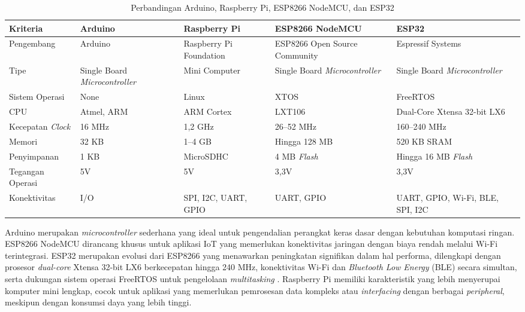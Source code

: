 \begin{enumerate}
  \begin{table}[H]
    \caption{Perbandingan Arduino, Raspberry Pi, ESP8266 NodeMCU, dan ESP32 \autocite{ooko2019, espressif2021}}
    \label{tab:perbandingan-mcu}
    \begin{tabularx}{\textwidth}{| l | X | X | X | X |}
      \hline
      \textbf{Kriteria} & \textbf{Arduino} & \textbf{Raspberry Pi} & \textbf{ESP8266 NodeMCU} & \textbf{ESP32} \\
      \hline
      Pengembang & Arduino & Raspberry Pi Foundation & ESP8266 Open Source Community & Espressif Systems \\
      \hline
      Tipe & Single Board \textit{Microcontroller} & Mini Computer & Single Board \textit{Microcontroller} & Single Board \textit{Microcontroller} \\
      \hline
      Sistem Operasi & None & Linux & XTOS & FreeRTOS \\
      \hline
      CPU & Atmel, ARM & ARM Cortex & LXT106 & Dual-Core Xtensa 32-bit LX6 \\
      \hline
      Kecepatan \textit{Clock} & 16 MHz & 1,2 GHz & 26--52 MHz & 160--240 MHz \\
      \hline
      Memori & 32 KB & 1--4 GB & Hingga 128 MB & 520 KB SRAM \\
      \hline
      Penyimpanan & 1 KB & MicroSDHC & 4 MB \textit{Flash} & Hingga 16 MB \textit{Flash} \\
      \hline
      Tegangan Operasi & 5V & 5V & 3,3V & 3,3V \\
      \hline
      Konektivitas & I/O & SPI, I2C, UART, GPIO & UART, GPIO & UART, GPIO, Wi-Fi, BLE, SPI, I2C \\
      \hline
    \end{tabularx}
  \end{table}

  Arduino merupakan \textit{microcontroller} sederhana yang ideal untuk pengendalian perangkat keras dasar dengan kebutuhan komputasi ringan. ESP8266 NodeMCU dirancang khusus untuk aplikasi IoT yang memerlukan konektivitas jaringan dengan biaya rendah melalui Wi-Fi terintegrasi. ESP32 merupakan evolusi dari ESP8266 yang menawarkan peningkatan signifikan dalam hal performa, dilengkapi dengan prosesor \textit{dual-core} Xtensa 32-bit LX6 berkecepatan hingga 240 MHz, konektivitas Wi-Fi dan \textit{Bluetooth Low Energy} (BLE) secara simultan, serta dukungan sistem operasi FreeRTOS untuk pengelolaan \textit{multitasking} \autocite{espressif2021}. Raspberry Pi memiliki karakteristik yang lebih menyerupai komputer mini lengkap, cocok untuk aplikasi yang memerlukan pemrosesan data kompleks atau \textit{interfacing} dengan berbagai \textit{peripheral}, meskipun dengan konsumsi daya yang lebih tinggi.


\end{enumerate}

